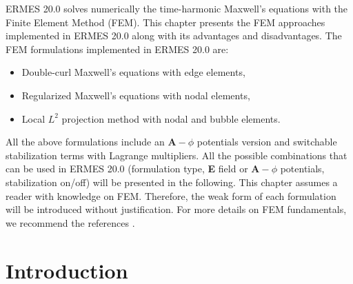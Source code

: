 %
%

ERMES 20.0 solves numerically the time-harmonic Maxwell's equations with the Finite Element Method (FEM). This chapter presents the FEM approaches implemented in ERMES 20.0 along with its advantages and disadvantages. The FEM formulations implemented in ERMES 20.0 are: 
\begin{itemize}
	\itemsep0em 
	\item Double-curl Maxwell's equations with edge elements,
	\item Regularized Maxwell's equations with nodal elements,
	\item Local $L^{2}$ projection method with nodal and bubble elements.
\end{itemize}
All the above formulations include an $\textbf{A}-\phi$ potentials version and switchable stabilization terms with Lagrange multipliers. All the possible combinations that can be used in ERMES 20.0 (formulation type, \textbf{E} field or $\textbf{A}-\phi$ potentials, stabilization on/off) will be presented in the following. This chapter assumes a reader with knowledge on FEM. Therefore, the weak form of each formulation will be introduced without justification. For more details on FEM fundamentals, we recommend the references \cite{Jin, Monk, LuisGarcia, Ferrari, Johnson, Zienkiewicz}.

\section{Introduction}\label{FEMIntro}


